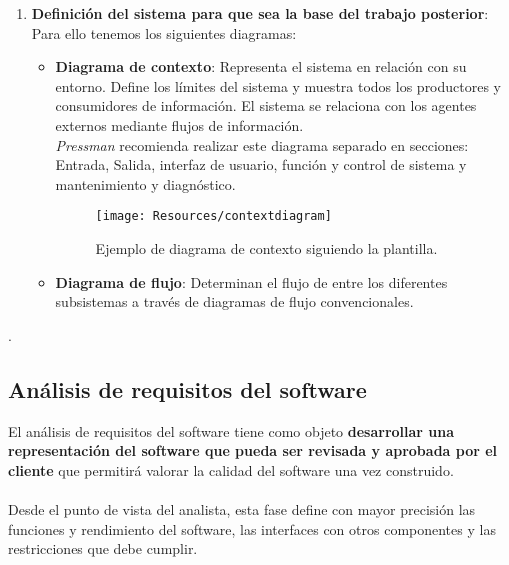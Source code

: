 \begin{enumerate}
    \item \textbf{Definición del sistema para que sea la base del trabajo posterior}: Para ello tenemos los siguientes diagramas:
          \begin{itemize}
              \item \textbf{Diagrama de contexto}: Representa el sistema en relación con su entorno. Define los límites del sistema y muestra todos los productores y consumidores de información. El sistema se relaciona con los agentes externos mediante flujos de información.\\
                    \textit{Pressman} recomienda realizar este diagrama separado en secciones: Entrada, Salida, interfaz de usuario, función y control de sistema y mantenimiento y diagnóstico.
                    \begin{figure}[H]
                        \centering
                        \texttt{[image: Resources/contextdiagram]}
                        \caption{Ejemplo de diagrama de contexto siguiendo la plantilla.}
                        \label{fig:diagramaDeContexto}
                    \end{figure}
              \item \textbf{Diagrama de flujo}: Determinan el flujo de entre los diferentes subsistemas a través de diagramas de flujo convencionales.
          \end{itemize}
\end{enumerate}.


\subsection{Análisis de requisitos del software}

El análisis de requisitos del software tiene como objeto\textbf{ desarrollar una representación del software que pueda ser revisada y aprobada por el cliente} que permitirá valorar la calidad del software una vez construido.
\\\\
Desde el punto de vista del analista, esta fase define con mayor precisión las funciones y rendimiento del software, las interfaces con otros componentes y las restricciones que debe cumplir.

